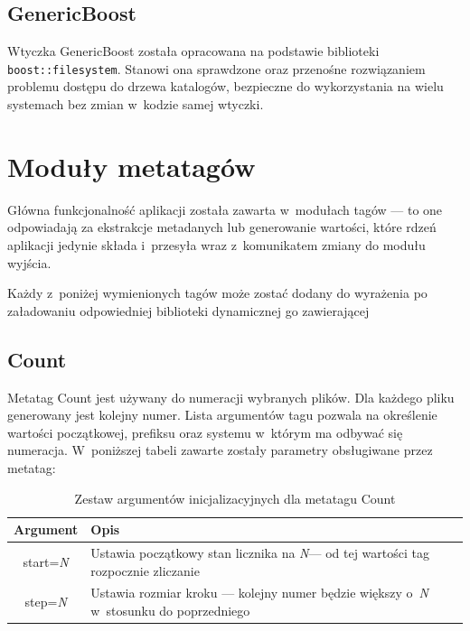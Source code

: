 \subsection{GenericBoost}
Wtyczka GenericBoost została opracowana na podstawie biblioteki \texttt{boost::filesystem}. Stanowi ona sprawdzone oraz przenośne rozwiązaniem problemu dostępu do drzewa katalogów, bezpieczne do wykorzystania na wielu systemach bez zmian w~kodzie samej wtyczki.


\section{Moduły metatagów}
Główna funkcjonalność aplikacji została zawarta w~modułach tagów --- to one odpowiadają za ekstrakcje metadanych lub generowanie wartości, które rdzeń aplikacji jedynie składa i~przesyła wraz z~komunikatem zmiany do modułu wyjścia.
\par
Każdy z~poniżej wymienionych tagów może zostać dodany do wyrażenia po załadowaniu odpowiedniej biblioteki dynamicznej go zawierającej

\subsection{Count}
Metatag Count jest używany do numeracji wybranych plików.
Dla każdego pliku generowany jest kolejny numer. Lista argumentów tagu pozwala na określenie wartości początkowej, prefiksu oraz systemu w~którym ma odbywać się numeracja.
 W~poniższej tabeli zawarte zostały parametry obsługiwane przez metatag:
\begin{table}[h]
\begin{center}
\begin{tabular}{| c | p{13cm} |}
\hline
\textbf{Argument} & \textbf{Opis} \\
\hline
start=\textit{N} & Ustawia początkowy stan licznika na \textit{N}--- od tej wartości tag rozpocznie zliczanie \\
step=\textit{N} & Ustawia rozmiar kroku --- kolejny numer będzie większy o~\textit{N} w~stosunku do poprzedniego \\
\hline
\end{tabular} \end{center}
\caption{Zestaw argumentów inicjalizacyjnych dla metatagu Count}
\end{table}

